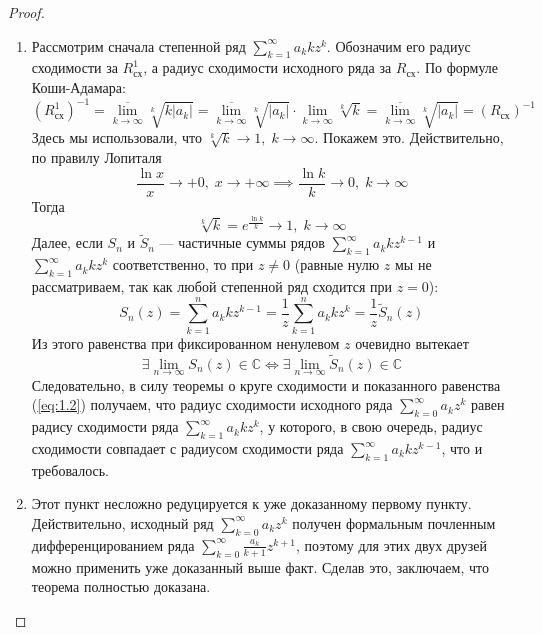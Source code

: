 \documentclass[11pt]{article}
\begin{document}
\begin{proof}
    \begin{enumerate}
        \item Рассмотрим сначала степенной ряд $\displaystyle \sum_{k = 1}^{\infty} a_k k z^k$. Обозначим его радиус сходимости за $R^1_{\text{сх}}$, а радиус сходимости исходного ряда за $R_{\text{сх}}$. По формуле Коши-Адамара:
        \begin{equation} \label{eq:1.2}
            \left(R^1_{\text{сх}}\right)^{-1} = \underset{k \to \infty}{\overline{\lim}} \sqrt[k]{k \left\lvert a_k \right\rvert} = \underset{k \to \infty}{\overline{\lim}} \sqrt[k]{\left\lvert a_k \right\rvert} \cdot \lim_{k \to \infty} \sqrt[k]{k} = \underset{k \to \infty}{\overline{\lim}} \sqrt[k]{\left\lvert a_k \right\rvert} = \left(R_{\text{сх}}\right)^{-1}
        \end{equation}
        Здесь мы использовали, что $\sqrt[k]{k} \to 1, \; k \to \infty$. Покажем это. Действительно, по правилу Лопиталя 
        \[\frac{\ln x}{x} \to +0, \; x \to + \infty \implies \frac{\ln k}{k} \to 0, \; k \to \infty\]
        Тогда
        \[\sqrt[k]{k} = e^{\frac{\ln k}{k}} \to 1, \; k \to \infty\]
        Далее, если $S_n$ и $\widetilde{S}_n$ --- частичные суммы рядов $\displaystyle \sum_{k = 1}^{\infty} a_k k z^{k - 1}$ и $\displaystyle \sum_{k = 1}^{\infty} a_k k z^{k}$ соответственно, то при $z \neq 0$ (равные нулю $z$ мы не рассматриваем, так как любой степенной ряд сходится при $z = 0$):
        \[S_n (z) = \sum_{k = 1}^n a_k k z^{k - 1} = \frac{1}{z} \sum_{k = 1}^n a_k k z^k = \frac{1}{z} \widetilde{S}_n (z)\]
        Из этого равенства при фиксированном ненулевом $z$ очевидно вытекает 
        \[\exists \lim_{n \to \infty} S_n (z) \in \mathbb{C} \iff \exists \lim_{n \to \infty} \widetilde{S}_n (z) \in \mathbb{C}\]
        Следовательно, в силу теоремы о круге сходимости и показанного равенства (\ref{eq:1.2}) получаем, что радиус сходимости исходного ряда $\displaystyle \sum_{k = 0}^{\infty} a_k z^k$ равен радису сходимости ряда $\displaystyle \sum_{k = 1}^{\infty} a_k k z^k$, у которого, в свою очередь, радиус сходимости совпадает с радиусом сходимости ряда $\displaystyle \sum_{k = 1}^{\infty} a_k k z^{k - 1}$, что и требовалось.
        \item Этот пункт несложно редуцируется к уже доказанному первому пункту. Действительно, исходный ряд $\displaystyle \sum_{k = 0}^{\infty} a_k z^k$ получен формальным почленным дифференцированием ряда $\displaystyle \sum_{k = 0}^{\infty} \frac{a_k}{k + 1} z^{k + 1}$, поэтому для этих двух друзей можно применить уже доказанный выше факт. Сделав это, заключаем, что теорема полностью доказана.
    \end{enumerate}
\end{proof}
\end{document}
